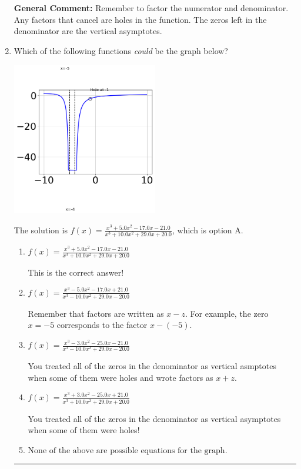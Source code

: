 \documentclass{extbook}[14pt]
\newcommand{\litem}[1]{\item #1

\rule{\textwidth}{0.4pt}}
\begin{document}
\begin{enumerate}
{\textbf{General Comment:} Remember to factor the numerator and denominator. Any factors that cancel are holes in the function. The zeros left in the denominator are the vertical asymptotes.
}
\litem{
Which of the following functions \textit{could} be the graph below?

\begin{center}
    \includegraphics[width=0.5\textwidth]{../Figures/identifyGraphOfRationalFunctionCopyB.png}
\end{center}


The solution is \( f(x)=\frac{x^{3} +5.0 x^{2} -17.0 x -21.0}{x^{3} +10.0 x^{2} +29.0 x + 20.0} \), which is option A.\begin{enumerate}[label=\Alph*.]
\item \( f(x)=\frac{x^{3} +5.0 x^{2} -17.0 x -21.0}{x^{3} +10.0 x^{2} +29.0 x + 20.0} \)

This is the correct answer!
\item \( f(x)=\frac{x^{3} -5.0 x^{2} -17.0 x + 21.0}{x^{3} -10.0 x^{2} +29.0 x -20.0} \)

Remember that factors are written as $x-z$. For example, the zero $x=-5$ corresponds to the factor $x-(-5)$.
\item \( f(x)=\frac{x^{3} -3.0 x^{2} -25.0 x -21.0}{x^{3} -10.0 x^{2} +29.0 x -20.0} \)

You treated all of the zeros in the denominator as vertical asmptotes when some of them were holes and wrote factors as $x+z$.
\item \( f(x)=\frac{x^{3} +3.0 x^{2} -25.0 x + 21.0}{x^{3} +10.0 x^{2} +29.0 x + 20.0} \)

You treated all of the zeros in the denominator as vertical asymptotes when some of them were holes!
\item \( \text{None of the above are possible equations for the graph.} \)


\end{enumerate}}
\end{enumerate}
\end{document}
